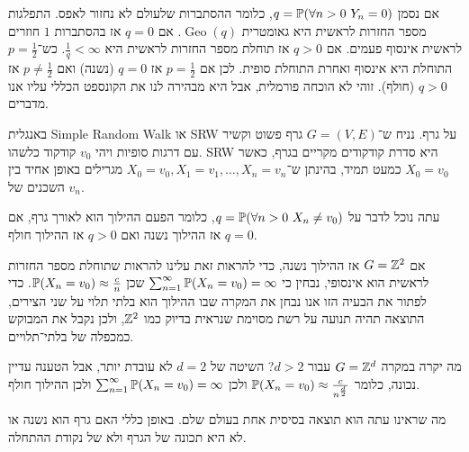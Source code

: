 \begin{example}
	אם נסמן $q = \mathbb{P}(\forall n > 0\ Y_n = 0)$, כלומר ההסתברות שלעולם לא נחזור לאפס.
	התפלגות מספר החזרות לראשית היא גאומטרית $\operatorname{Geo}(q)$.
	אם $q = 0$ אז בהסתברות $1$ חוזרים לראשית אינסוף פעמים.
	אם $q > 0$ אז תוחלת מספר החזרות לראשית היא $\frac{1}{q} < \infty$.
	כש־$p = \frac{1}{2}$ התוחלת היא אינסוף ואחרת התוחלת סופית.
	לכן אם $p = \frac{1}{2}$ אז $q = 0$ (נשנה) ואם $p \ne \frac{1}{2}$ אז $q > 0$ (חולף).
	זוהי לא הוכחה פורמלית, אבל היא מבהירה לנו את הקונספט הכללי עליו אנו מדברים.
\end{example}
\begin{definition}
	באנגלית Simple Random Walk או SRW על גרף.
	נניח ש־$G = (V, E)$ גרף פשוט וקשיר עם דרגות סופיות ויהי $v_0$ קודקוד כלשהו.
	SRW היא סדרת קודקודים מקריים בגרף, כאשר $X_0 = v_0$ כמעט תמיד, בהינתן ש־$X_0 = v_0, X_1 = v_1, \ldots, X_n = v_n$ מגרילים באופן אחיד בין השכנים של $v_n$.
\end{definition}
\begin{example}
	עתה נוכל לדבר על $q = \PP(\forall n > 0\ X_n \ne v_0)$, כלומר הפעם ההילוך הוא לאורך גרף, אם $q = 0$ אז ההילוך נשנה ואם $q > 0$ אז ההילוך חולף.

	אם $G = \mathbb{Z}^2$ אז ההילוך נשנה, כדי להראות זאת עלינו להראות שתוחלת מספר החזרות לראשית הוא אינסופי, נבחין כי $\sum_{n = 1}^\infty \mathbb{P}(X_n = v_0) = \infty$ שכן $\mathbb{P}(X_n = v_0) \approx \frac{c}{n}$.
	כדי לפתור את הבעיה הזו אנו נבחן את המקרה שבו ההילוך הוא בלתי תלוי על שני הצירים, התוצאה תהיה תנועה על רשת מסוימת שנראית בדיוק כמו $\mathbb{Z}^2$, ולכן נקבל את המבוקש כמכפלה של בלתי־תלויים.

	מה יקרה במקרה $G = \mathbb{Z}^d$ עבור $d > 2$? השיטה של $d = 2$ לא עובדת יותר, אבל הטענה עדיין נכונה, כלומר $\mathbb{P}(X_n = v_0) \approx \frac{c}{n^\frac{d}{2}}$ ולכן $\sum_{n = 1}^\infty \mathbb{P}(X_n = v_0) = \infty$ ולכן ההילוך חולף.
\end{example}
מה שראינו עתה הוא תוצאה בסיסית אחת בעולם שלם.
באופן כללי האם גרף הוא נשנה או לא היא תכונה של הגרף ולא של נקודת ההתחלה.

